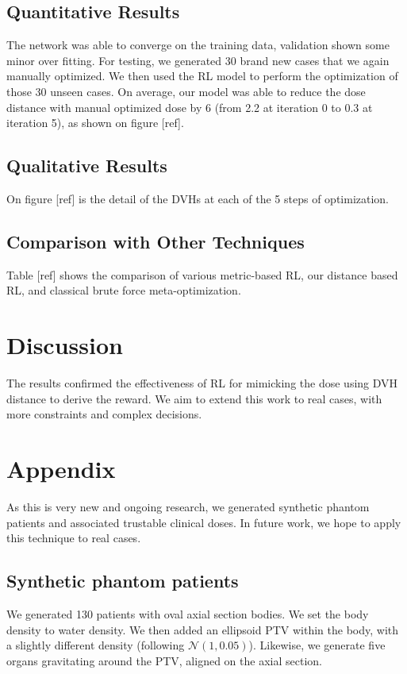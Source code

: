 \subsection{Quantitative Results}
The network was able to converge on the training data, validation shown some minor over fitting.
For testing, we generated 30 brand new cases that we again manually optimized.
We then used the RL model to perform the optimization of those 30 unseen cases.
On average, our model was able to reduce the dose distance with manual optimized dose by 6 (from 2.2 at iteration 0 to 0.3 at iteration 5), as shown on figure [ref].

\subsection{Qualitative Results}
On figure [ref] is the detail of the DVHs at each of the 5 steps of optimization.

\subsection{Comparison with Other Techniques}
Table [ref] shows the comparison of various metric-based RL, our distance based RL, and classical brute force meta-optimization.

\section{Discussion}
The results confirmed the effectiveness of RL for mimicking the dose using DVH distance to derive the reward.
We aim to extend this work to real cases, with more constraints and complex decisions.

\section*{Appendix}
As this is very new and ongoing research, we generated synthetic phantom patients and associated trustable clinical doses.
In future work, we hope to apply this technique to real cases.

\subsection*{Synthetic phantom patients}
We generated 130 patients with oval axial section bodies.
We set the body density to water density.
We then added an ellipsoid PTV within the body, with a slightly different density (following $\mathcal{N}(1,0.05)$).
Likewise, we generate five organs gravitating around the PTV, aligned on the axial section.

